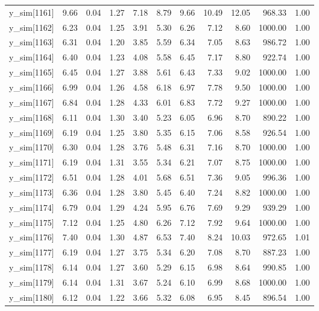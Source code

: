 \begin{table}[ht]
\begin{tabular}{rrrrrrrrrrr}
  y\_sim[1161] & 9.66 & 0.04 & 1.27 & 7.18 & 8.79 & 9.66 & 10.49 & 12.05 & 968.33 & 1.00 \\ 
  y\_sim[1162] & 6.23 & 0.04 & 1.25 & 3.91 & 5.30 & 6.26 & 7.12 & 8.60 & 1000.00 & 1.00 \\ 
  y\_sim[1163] & 6.31 & 0.04 & 1.20 & 3.85 & 5.59 & 6.34 & 7.05 & 8.63 & 986.72 & 1.00 \\ 
  y\_sim[1164] & 6.40 & 0.04 & 1.23 & 4.08 & 5.58 & 6.45 & 7.17 & 8.80 & 922.74 & 1.00 \\ 
  y\_sim[1165] & 6.45 & 0.04 & 1.27 & 3.88 & 5.61 & 6.43 & 7.33 & 9.02 & 1000.00 & 1.00 \\ 
  y\_sim[1166] & 6.99 & 0.04 & 1.26 & 4.58 & 6.18 & 6.97 & 7.78 & 9.50 & 1000.00 & 1.00 \\ 
  y\_sim[1167] & 6.84 & 0.04 & 1.28 & 4.33 & 6.01 & 6.83 & 7.72 & 9.27 & 1000.00 & 1.00 \\ 
  y\_sim[1168] & 6.11 & 0.04 & 1.30 & 3.40 & 5.23 & 6.05 & 6.96 & 8.70 & 890.22 & 1.00 \\ 
  y\_sim[1169] & 6.19 & 0.04 & 1.25 & 3.80 & 5.35 & 6.15 & 7.06 & 8.58 & 926.54 & 1.00 \\ 
  y\_sim[1170] & 6.30 & 0.04 & 1.28 & 3.76 & 5.48 & 6.31 & 7.16 & 8.70 & 1000.00 & 1.00 \\ 
  y\_sim[1171] & 6.19 & 0.04 & 1.31 & 3.55 & 5.34 & 6.21 & 7.07 & 8.75 & 1000.00 & 1.00 \\ 
  y\_sim[1172] & 6.51 & 0.04 & 1.28 & 4.01 & 5.68 & 6.51 & 7.36 & 9.05 & 996.36 & 1.00 \\ 
  y\_sim[1173] & 6.36 & 0.04 & 1.28 & 3.80 & 5.45 & 6.40 & 7.24 & 8.82 & 1000.00 & 1.00 \\ 
  y\_sim[1174] & 6.79 & 0.04 & 1.29 & 4.24 & 5.95 & 6.76 & 7.69 & 9.29 & 939.29 & 1.00 \\ 
  y\_sim[1175] & 7.12 & 0.04 & 1.25 & 4.80 & 6.26 & 7.12 & 7.92 & 9.64 & 1000.00 & 1.00 \\ 
  y\_sim[1176] & 7.40 & 0.04 & 1.30 & 4.87 & 6.53 & 7.40 & 8.24 & 10.03 & 972.65 & 1.01 \\ 
  y\_sim[1177] & 6.19 & 0.04 & 1.27 & 3.75 & 5.34 & 6.20 & 7.08 & 8.70 & 887.23 & 1.00 \\ 
  y\_sim[1178] & 6.14 & 0.04 & 1.27 & 3.60 & 5.29 & 6.15 & 6.98 & 8.64 & 990.85 & 1.00 \\ 
  y\_sim[1179] & 6.14 & 0.04 & 1.31 & 3.67 & 5.24 & 6.10 & 6.99 & 8.68 & 1000.00 & 1.00 \\ 
  y\_sim[1180] & 6.12 & 0.04 & 1.22 & 3.66 & 5.32 & 6.08 & 6.95 & 8.45 & 896.54 & 1.00 \\ 

\end{tabular}
\end{table}
